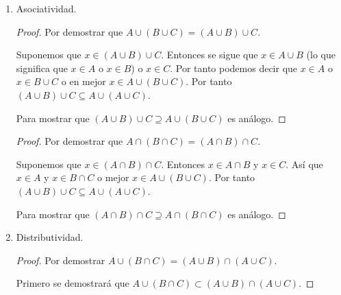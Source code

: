 \documentclass[11pt,letterpaper]{report}
\begin{document}
\begin{enumerate}
\begin{enumerate}[label=\alph*)]
\begin{proof}
        Suponemos que $x \in A \cup B$. Entonces $x \in A$ o $x \in B$ o $x \in A \cap B$ lo
        cual escribimos $x \in B \cup A$. Por tanto $A \cup B = B \cup A$.
    \end{proof}

    \begin{proof}
        Por demostrar $A \cap B = B \cap A$.

        Suponemos que $x \in A \cap B$. Si $x$ está en ambos $A$ y $B$, entonces podemos decir que
        $x$ está en ambos $B$ y $A$ o $x \in B \cap A$. Por tanto $A \cap B = B \cap A$.
    \end{proof}

    \item Asociatividad.
    \begin{proof}
        Por demostrar que $A \cup (B \cup C) = (A \cup B) \cup C$.

        Suponemos que $x \in (A \cup B) \cup C$. Entonces se sigue que $x \in A \cup B$
        (lo que significa que $x \in A$ o $x \in B$) o $x \in C$. Por tanto podemos decir
        que $x \in A$ o $x \in B \cup C$ o en mejor $x \in A \cup (B \cup C)$. Por
        tanto $(A \cup B) \cup C \subseteq A \cup (A \cup C)$.

        Para mostrar que $(A \cup B) \cup C \supseteq A \cup (B \cup C)$ es análogo.
    \end{proof}

    \begin{proof}
        Por demostrar que $A \cap (B \cap C) = (A \cap B) \cap C$.

        Suponemos que $x \in (A \cap B) \cap C$. Entonces $x \in A \cap B$ y $x \in C$.
        Así que $x \in A$ y $x \in B \cap C$ o mejor $x \in A \cup (B \cup C)$. Por
        tanto $(A \cup B) \cup C \subseteq A \cup (A \cup C)$.

        Para mostrar que $(A \cap B) \cap C \supseteq A \cap (B \cap C)$ es análogo.
    \end{proof}

    \item Distributividad.
    
    \begin{proof}
        Por demostrar $A \cup (B \cap C) = (A \cup B) \cap (A \cup C)$.

        Primero se demostrará que $A \cup (B \cap C) \subset (A \cup B) \cap (A \cup C)$.


\end{proof}
\end{enumerate}
\end{enumerate}
\end{document}
